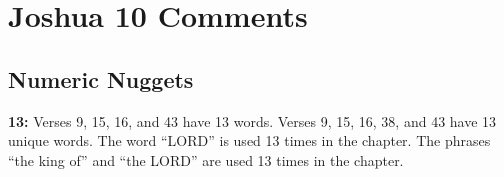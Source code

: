 \section{Joshua 10 Comments}

\subsection{Numeric Nuggets}
\textbf{13: } Verses 9, 15, 16, and 43 have 13 words. Verses 9, 15, 16, 38, and 43 have 13 unique words. The word ``LORD'' is used 13 times in the chapter. The phrases ``the king of'' and ``the LORD'' are used 13 times in the chapter.